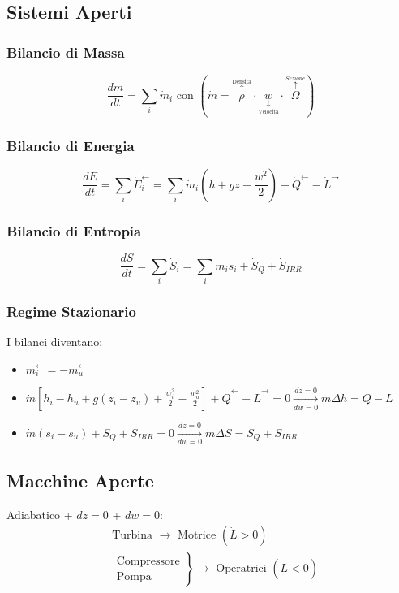 \documentclass[a4paper]{report}
\begin{document}
\subsection*{Sistemi Aperti}
\subsubsection*{Bilancio di Massa}
\[
    \frac{dm}{dt}=\sum_i \dot{m}_i \text{ con }(\dot{m}=\overset{\overset{\text{Densità}}{\uparrow}}{\rho} \cdot \underset{\underset{\text{Velocità}}{\downarrow}}{w} \cdot \overset{\overset{Sezione}{\uparrow}}{\Omega})
\]
\subsubsection*{Bilancio di Energia}
\[
    \frac{dE}{dt}=\sum_i \dot{E}^{\leftarrow}_i=\sum_i \dot{m}_i\left(h+gz+\frac{w^2}{2}\right)+\dot{Q}^{\leftarrow}-\dot{L}^{\rightarrow}
\]
\subsubsection*{Bilancio di Entropia}
\[
    \frac{dS}{dt}=\sum_i \dot{S}_i= \sum_i \dot{m}_is_i+\dot{S}_Q+\dot{S}_{IRR}
\]
\subsubsection*{Regime Stazionario}
I bilanci diventano:
\begin{itemize}
    \item $\boxed{\dot{m}_i^\leftarrow = -\dot{m}_u^\leftarrow}$
    \item $\boxed{\dot{m}\left[h_i-h_u+g(z_i-z_u)+\frac{w_i^2}{2}-\frac{w_u^2}{2}\right] + \dot{Q}^\leftarrow - \dot{L}^\rightarrow = 0}\xrightarrow[dw=0]{dz=0}\boxed{\dot{m}\Delta h = \dot{Q}-\dot{L}}$
    \item $\boxed{\dot{m}(s_i-s_u)+\dot{S}_Q+\dot{S}_{IRR}=0}\xrightarrow[dw=0]{dz=0}\boxed{\dot{m}\Delta S = \dot{S}_Q+\dot{S}_{IRR}}$
\end{itemize}


\subsection*{Macchine Aperte}
Adiabatico + $dz=0$ + $dw=0$:
\begin{align*}
    &\text{Turbina }\longrightarrow \text{ Motrice } (\dot{L}>0)\\
    &\left.\begin{array}{l}
        \text{Compressore}\\
        \text{Pompa}
    \end{array} \right\}\longrightarrow \text{ Operatrici }(\dot{L}<0)
\end{align*}
\end{document}
